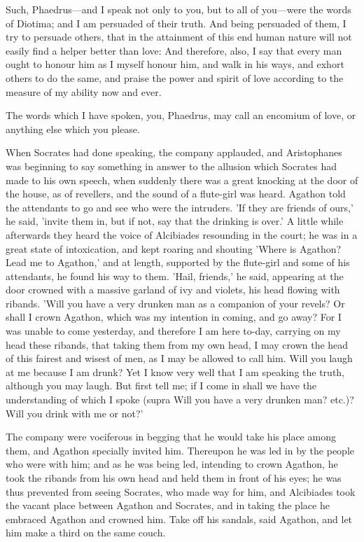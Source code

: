 \documentclass[11pt,letter]{article}
\begin{document}
\par  Such, Phaedrus—and I speak not only to you, but to all of you—were the words of Diotima; and I am persuaded of their truth. And being persuaded of them, I try to persuade others, that in the attainment of this end human nature will not easily find a helper better than love: And therefore, also, I say that every man ought to honour him as I myself honour him, and walk in his ways, and exhort others to do the same, and praise the power and spirit of love according to the measure of my ability now and ever.

\par  The words which I have spoken, you, Phaedrus, may call an encomium of love, or anything else which you please.

\par  When Socrates had done speaking, the company applauded, and Aristophanes was beginning to say something in answer to the allusion which Socrates had made to his own speech, when suddenly there was a great knocking at the door of the house, as of revellers, and the sound of a flute-girl was heard. Agathon told the attendants to go and see who were the intruders. 'If they are friends of ours,' he said, 'invite them in, but if not, say that the drinking is over.' A little while afterwards they heard the voice of Alcibiades resounding in the court; he was in a great state of intoxication, and kept roaring and shouting 'Where is Agathon? Lead me to Agathon,' and at length, supported by the flute-girl and some of his attendants, he found his way to them. 'Hail, friends,' he said, appearing at the door crowned with a massive garland of ivy and violets, his head flowing with ribands. 'Will you have a very drunken man as a companion of your revels? Or shall I crown Agathon, which was my intention in coming, and go away? For I was unable to come yesterday, and therefore I am here to-day, carrying on my head these ribands, that taking them from my own head, I may crown the head of this fairest and wisest of men, as I may be allowed to call him. Will you laugh at me because I am drunk? Yet I know very well that I am speaking the truth, although you may laugh. But first tell me; if I come in shall we have the understanding of which I spoke (supra Will you have a very drunken man? etc.)? Will you drink with me or not?'

\par  The company were vociferous in begging that he would take his place among them, and Agathon specially invited him. Thereupon he was led in by the people who were with him; and as he was being led, intending to crown Agathon, he took the ribands from his own head and held them in front of his eyes; he was thus prevented from seeing Socrates, who made way for him, and Alcibiades took the vacant place between Agathon and Socrates, and in taking the place he embraced Agathon and crowned him. Take off his sandals, said Agathon, and let him make a third on the same couch.
\end{document}
